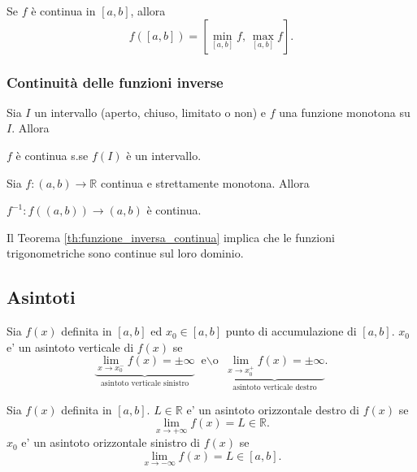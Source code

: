 \begin{theorem}
    Se $f$ è continua in $[a,b]$, allora
    \begin{equation*}
        f([a,b])=\left[\underset{[a,b]}{\min}f,\, \underset{[a,b]}{\max}f\right].
    \end{equation*}
\end{theorem}

\subsubsection{Continuità delle funzioni inverse}

\begin{proposition}
    Sia $I$ un intervallo (aperto, chiuso, limitato o non) e $f$ una funzione monotona su $I$. Allora
    \begin{center}
        $f$ è continua s.se $f(I)$ è un intervallo.
    \end{center}
\end{proposition}

\begin{theorem}\label{th:funzione_inversa_continua}
    Sia $f\colon (a,b)\rightarrow\mathbb R$ continua e strettamente monotona. Allora
    \begin{center}
        $f^{-1}:f((a,b))\rightarrow(a,b)$ è continua.
    \end{center}
\end{theorem}

Il Teorema \ref{th:funzione_inversa_continua} implica che le funzioni trigonometriche sono continue sul loro dominio.

\subsection{Asintoti}
\begin{definition}
    Sia $f(x)$ definita in $[a,b]$ ed $x_0\in[a,b]$ punto di accumulazione di $[a,b]$. $x_0$ e' un asintoto verticale di $f(x)$ se
    \begin{equation*}
        \underbrace{\lim_{x\rightarrow x_0^-}f(x)=\pm\infty}_{\text{asintoto verticale sinistro}}\text{ e$\backslash$o } \underbrace{\lim_{x\rightarrow x_0^+}f(x)=\pm\infty}_{\text{asintoto verticale destro}}.
    \end{equation*}
\end{definition}

\begin{definition}
    Sia $f(x)$ definita in $[a,b]$. $L\in\mathbb R$ e' un asintoto orizzontale destro di $f(x)$ se
    \begin{equation*}
        \lim_{x\rightarrow+\infty}f(x)=L\in\mathbb R.
    \end{equation*}
    $x_0$ e' un asintoto orizzontale sinistro di $f(x)$ se
    \begin{equation*}
        \lim_{x\rightarrow-\infty}f(x)=L\in[a,b].
    \end{equation*}
\end{definition}

